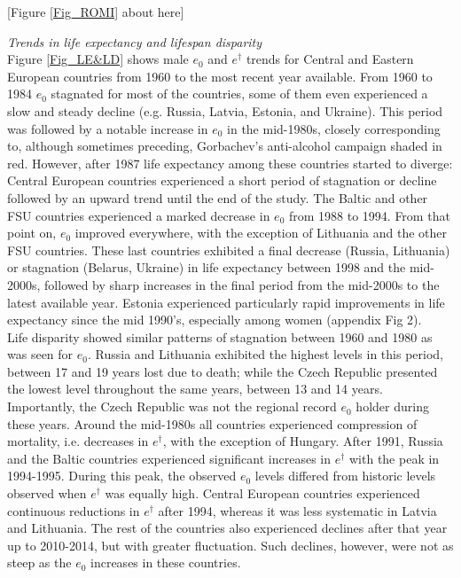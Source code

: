 \documentclass{article}
\begin{document}
\begin{spacing}{1.5}
\begin{center}
[Figure \ref{Fig_ROMI} about here]
\end{center}

\emph{Trends in life expectancy and lifespan disparity}\\

Figure \ref{Fig_LE&LD} shows male $e_0$ and $e^{\dagger}$ trends for Central and Eastern European countries from 1960 to the most recent year available. From 1960 to 1984 $e_0$ stagnated for most of the countries, some of them even experienced a slow and steady decline (e.g. Russia, Latvia, Estonia, and Ukraine). This period was followed by a notable increase in $e_0$ in the mid-1980s, closely corresponding to, although sometimes preceding, Gorbachev's anti-alcohol campaign shaded in red. However, after 1987 life expectancy among these countries started to diverge: Central European countries experienced a short period of stagnation or decline followed by an upward trend until the end of the study. The Baltic and other FSU countries experienced a marked decrease in $e_0$ from 1988 to 1994. From that point on, $e_0$ improved everywhere, with the exception of Lithuania and the other FSU countries. These last countries exhibited a final decrease (Russia, Lithuania) or stagnation (Belarus, Ukraine) in life expectancy between 1998 and the mid-2000s, followed by sharp increases in the final period from the mid-2000s to the latest available year. Estonia experienced particularly rapid improvements in life expectancy since the mid 1990's, especially among women (appendix Fig 2). \\

Life disparity showed similar patterns of stagnation between 1960 and 1980 as was seen for $e_0$. Russia and Lithuania exhibited the highest levels in this period, between 17 and 19 years lost due to death; while the Czech Republic presented the lowest level throughout the same years, between 13 and 14 years. Importantly, the Czech Republic was not the regional record $e_0$ holder during these years. Around the mid-1980s all countries experienced compression of mortality, i.e. decreases in $e^{\dagger}$, with the exception of Hungary. After 1991, Russia and the Baltic countries experienced significant increases in $e^{\dagger}$ with the peak in 1994-1995. During this peak, the observed $e_0$ levels differed from historic levels observed when $e^{\dagger}$ was equally high. Central European countries experienced continuous reductions in $e^{\dagger}$ after 1994, whereas it was less systematic in Latvia and Lithuania. The rest of the countries also experienced declines after that year up to 2010-2014, but with greater fluctuation. Such declines, however, were not as steep as the $e_0$ increases in these countries.\\
 

\end{spacing}
\end{document}

